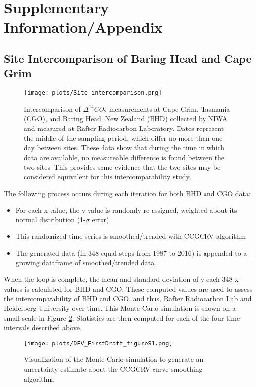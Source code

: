 \section{Supplementary Information/Appendix}

\subsection{Site Intercomparison of Baring Head and Cape Grim}


\begin{figure}[htp]
    \centering
    \texttt{[image: plots/Site\_intercomparison.png]}
    \caption{Intercomparison of ${\Delta^{14}CO_{2}}$ measurements  at Cape Grim, Tasmania (CGO), and Baring Head, New Zealand (BHD) collected by NIWA and measured at Rafter Radiocarbon Laboratory. Dates represent the middle of the sampling period, which differ no more than one day between sites. These data show that during the time in which data are available, no measureable difference is found between the two sites. This provides some evidence that the two sites may be considered equivalent for this intercomparability study.}
    \label{fig:bhdvcgo}
\end{figure}


The following process occurs during each iteration for both BHD and CGO data: 
\begin{itemize}
	\item For each x-value, the y-value is  randomly re-assigned, weighted about its normal distribution (1-${\sigma}$ error). 
	\item This randomized time-series is smoothed/trended with CCGCRV algorithm 
	\item The generated data (in 348 equal steps from 1987 to 2016) is appended to a growing dataframe of smoothed/trended data.
\end{itemize}
When the loop is complete, the mean and standard deviation of y each 348 x-values is calculated for BHD and CGO. These computed values are used to assess the intercomparability of BHD and CGO, and thus, Rafter Radiocarbon Lab and Heidelberg University over time. This Monte-Carlo simulation is shown on a small scale in Figure \ref{fig:montecarloexplained}. Statistics are then computed for each of the four time-intervals described above. 

\begin{figure}[htp]
    \centering
    \texttt{[image: plots/DEV\_FirstDraft\_figureS1.png]}
    \caption{Visualization of the Monte Carlo simulation to generate an uncertainty estimate about the CCGCRV curve smoothing algorithm.}
    \label{fig:montecarloexplained}
\end{figure}
